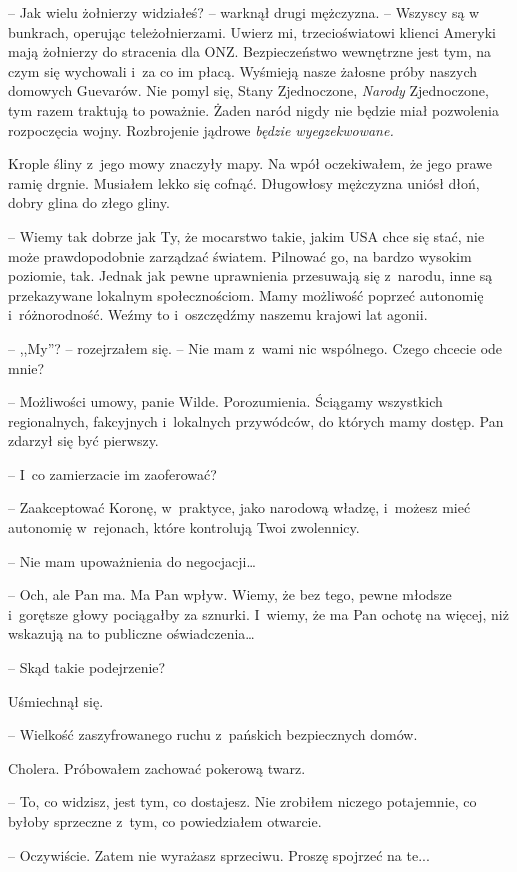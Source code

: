 \documentclass[oneside,polish,11pt,sfheadings]{mwbk}
\begin{document}
-- Jak wielu żołnierzy widziałeś? -- warknął drugi mężczyzna. -- Wszyscy są
w bunkrach, operując teleżołnierzami. Uwierz mi, trzecioświatowi klienci
Ameryki mają żołnierzy do stracenia dla ONZ. Bezpieczeństwo wewnętrzne
jest tym, na czym się wychowali i~za co im płacą. Wyśmieją nasze żałosne
próby naszych domowych Guevarów. Nie pomyl się, Stany Zjednoczone,
\emph{Narody} Zjednoczone, tym razem traktują to poważnie. Żaden naród
nigdy nie będzie miał pozwolenia rozpoczęcia wojny. Rozbrojenie jądrowe
\emph{będzie wyegzekwowane.}

Krople śliny z~jego mowy znaczyły mapy. Na wpół oczekiwałem, że jego
prawe ramię drgnie. Musiałem lekko się cofnąć. Długowłosy mężczyzna
uniósł dłoń, dobry glina do złego gliny.

-- Wiemy tak dobrze jak Ty, że mocarstwo takie, jakim USA chce się stać,
nie może prawdopodobnie zarządzać światem. Pilnować go, na bardzo
wysokim poziomie, tak. Jednak jak pewne uprawnienia przesuwają się z~narodu, inne są przekazywane lokalnym społecznościom. Mamy możliwość
poprzeć autonomię i~różnorodność. Weźmy to i~oszczędźmy naszemu krajowi
lat agonii.

-- ,,My''? -- rozejrzałem się. -- Nie mam z~wami nic wspólnego. Czego chcecie
ode mnie?

-- Możliwości umowy, panie Wilde. Porozumienia. Ściągamy wszystkich
regionalnych, fakcyjnych i~lokalnych przywódców, do których mamy dostęp.
Pan zdarzył się być pierwszy.

-- I~co zamierzacie im zaoferować?

-- Zaakceptować Koronę, w~praktyce, jako narodową władzę, i~możesz mieć
autonomię w~rejonach, które kontrolują Twoi zwolennicy.

-- Nie mam upoważnienia do negocjacji\ldots

-- Och, ale Pan ma. Ma Pan wpływ. Wiemy, że bez tego, pewne młodsze i~gorętsze głowy pociągałby za sznurki. I~wiemy, że ma Pan ochotę na
więcej, niż wskazują na to publiczne oświadczenia\ldots

-- Skąd takie podejrzenie?

Uśmiechnął się. 

-- Wielkość zaszyfrowanego ruchu z~pańskich bezpiecznych
domów.

Cholera. Próbowałem zachować pokerową twarz.

-- To, co widzisz, jest tym, co dostajesz. Nie zrobiłem niczego
potajemnie, co byłoby sprzeczne z~tym, co powiedziałem otwarcie.

-- Oczywiście. Zatem nie wyrażasz sprzeciwu. Proszę spojrzeć na te...
\end{document}
